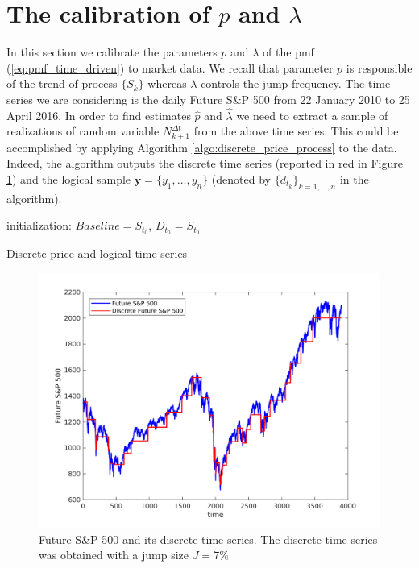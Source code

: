 \section{The calibration of $p$ and $\lambda$}\label{sec:ED_dataset}
In this section we calibrate the parameters $p$ and $\lambda$ of the pmf (\ref{eq:pmf_time_driven}) to market data. We recall that parameter $p$ is responsible of the trend of process $\{S_k\}$ whereas $\lambda$ controls the jump frequency. The time series we are considering is the daily Future S\&P 500 from 22 January 2010 to 25 April 2016. In order to find estimates $\widehat{p}$ and $\widehat{\lambda}$ we need to extract a sample of realizations of random variable $N_{k+1}^{\Delta t}$ from the above time series. This could be accomplished by applying Algorithm \ref{algo:discrete_price_process} to the data. Indeed,  the algorithm outputs the discrete time series (reported in red in Figure \ref{fig:DiscreteDynamics}) and the logical sample $\bm{y}=\{y_1,\ldots,y_n\}$ (denoted by $\{d_{t_k}\}_{k=1,\ldots,n}$ in the algorithm).
\begin{algorithm}[H]
	\SetAlgoLined
	initialization: $Baseline = S_{t_0}$, $D_{t_0}=S_{t_0}$\;
	
\caption{Discrete price and logical time series}
\label{algo:discrete_price_process}
\end{algorithm}
\begin{figure}
	\centering
	\includegraphics[scale = 0.7]{Images/DiscreteDynamics}
	\caption{Future S\&P 500 and its discrete time series. The discrete time series was obtained with a jump size $J=7\%$}
	\label{fig:DiscreteDynamics}
\end{figure}
